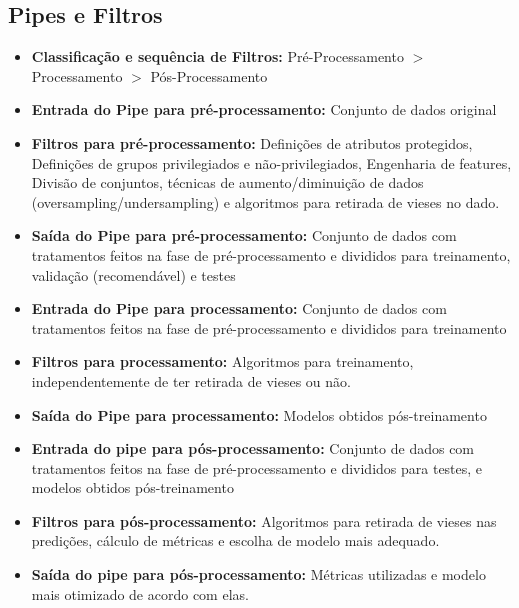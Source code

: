 \documentclass[portugues, 12pt, a4paper]{article}
\begin{document}
\subsection{Pipes e Filtros}

\begin{itemize}
\item \textbf{Classificação e sequência de Filtros:} Pré-Processamento $>$ Processamento $>$ Pós-Processamento

\item \textbf{Entrada do Pipe para pré-processamento:} Conjunto de dados original

\item \textbf{Filtros para pré-processamento:} Definições de atributos protegidos, Definições de grupos privilegiados e não-privilegiados, Engenharia de features, Divisão de conjuntos, técnicas de aumento/diminuição de dados (oversampling/undersampling) e algoritmos para retirada de vieses no dado.

\item \textbf{Saída do Pipe para pré-processamento:} Conjunto de dados com tratamentos feitos na fase de pré-processamento e divididos para treinamento, validação (recomendável) e testes

\item \textbf{Entrada do Pipe para processamento:} Conjunto de dados com tratamentos feitos na fase de pré-processamento e divididos para treinamento

\item \textbf{Filtros para processamento:} Algoritmos para treinamento, independentemente de ter retirada de vieses ou não.

\item \textbf{Saída do Pipe para processamento:} Modelos obtidos pós-treinamento

\item \textbf{Entrada do pipe para pós-processamento:} Conjunto de dados com tratamentos feitos na fase de pré-processamento e divididos para testes, e modelos obtidos pós-treinamento

\item \textbf{Filtros para pós-processamento:} Algoritmos para retirada de vieses nas predições, cálculo de métricas e escolha de modelo mais adequado.

\item \textbf{Saída do pipe para pós-processamento:} Métricas utilizadas e modelo mais otimizado de acordo com elas.
\end{itemize}
\end{document}
